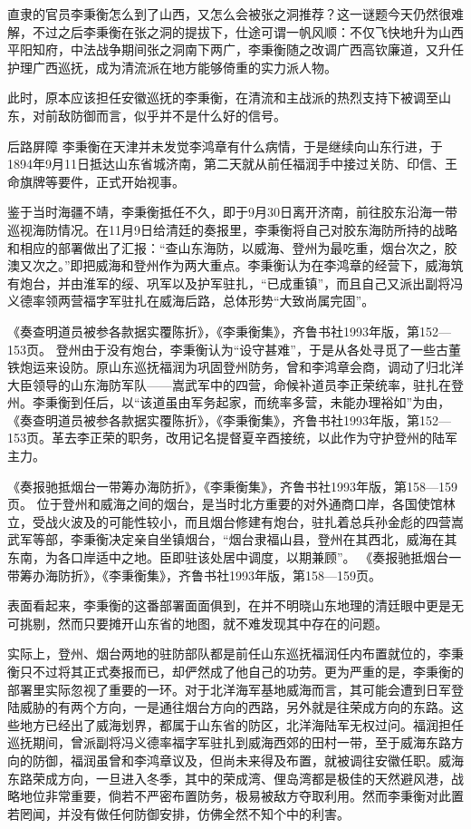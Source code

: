 \documentclass[12pt,UTF8]{ctexbook}
\begin{document}
直隶的官员李秉衡怎么到了山西，又怎么会被张之洞推荐？这一谜题今天仍然很难解，不过之后李秉衡在张之洞的提拔下，仕途可谓一帆风顺：不仅飞快地升为山西平阳知府，中法战争期间张之洞南下两广，李秉衡随之改调广西高钦廉道，又升任护理广西巡抚，成为清流派在地方能够倚重的实力派人物。

此时，原本应该担任安徽巡抚的李秉衡，在清流和主战派的热烈支持下被调至山东，对前敌防御而言，似乎并不是什么好的信号。

后路屏障
李秉衡在天津并未发觉李鸿章有什么病情，于是继续向山东行进，于1894年9月11日抵达山东省城济南，第二天就从前任福润手中接过关防、印信、王命旗牌等要件，正式开始视事。

鉴于当时海疆不靖，李秉衡抵任不久，即于9月30日离开济南，前往胶东沿海一带巡视海防情况。在11月9日给清廷的奏报里，李秉衡将自己对胶东海防所持的战略和相应的部署做出了汇报：“查山东海防，以威海、登州为最吃重，烟台次之，胶澳又次之。”即把威海和登州作为两大重点。李秉衡认为在李鸿章的经营下，威海筑有炮台，并由淮军的绥、巩军以及护军驻扎，“已成重镇”，而且自己又派出副将冯义德率领两营福字军驻扎在威海后路，总体形势“大致尚属完固”。

《奏查明道员被参各款据实覆陈折》，《李秉衡集》，齐鲁书社1993年版，第152—153页。
登州由于没有炮台，李秉衡认为“设守甚难”，于是从各处寻觅了一些古董铁炮运来设防。原山东巡抚福润为巩固登州防务，曾和李鸿章会商，调动了归北洋大臣领导的山东海防军队——嵩武军中的四营，命候补道员李正荣统率，驻扎在登州。李秉衡到任后，以“该道虽由军务起家，而统率多营，未能办理裕如”为由， 《奏查明道员被参各款据实覆陈折》，《李秉衡集》，齐鲁书社1993年版，第152—153页。革去李正荣的职务，改用记名提督夏辛酉接统，以此作为守护登州的陆军主力。

《奏报驰抵烟台一带筹办海防折》，《李秉衡集》，齐鲁书社1993年版，第158—159页。
位于登州和威海之间的烟台，是当时北方重要的对外通商口岸，各国使馆林立，受战火波及的可能性较小，而且烟台修建有炮台，驻扎着总兵孙金彪的四营嵩武军等部，李秉衡决定亲自坐镇烟台，“烟台隶福山县，登州在其西北，威海在其东南，为各口岸适中之地。臣即驻该处居中调度，以期兼顾”。 《奏报驰抵烟台一带筹办海防折》，《李秉衡集》，齐鲁书社1993年版，第158—159页。

表面看起来，李秉衡的这番部署面面俱到，在并不明晓山东地理的清廷眼中更是无可挑剔，然而只要摊开山东省的地图，就不难发现其中存在的问题。

实际上，登州、烟台两地的驻防部队都是前任山东巡抚福润任内布置就位的，李秉衡只不过将其正式奏报而已，却俨然成了他自己的功劳。更为严重的是，李秉衡的部署里实际忽视了重要的一环。对于北洋海军基地威海而言，其可能会遭到日军登陆威胁的有两个方向，一是通往烟台方向的西路，另外就是往荣成方向的东路。这些地方已经出了威海划界，都属于山东省的防区，北洋海陆军无权过问。福润担任巡抚期间，曾派副将冯义德率福字军驻扎到威海西郊的田村一带，至于威海东路方向的防御，福润虽曾和李鸿章议及，但尚未来得及布置，就被调往安徽任职。威海东路荣成方向，一旦进入冬季，其中的荣成湾、俚岛湾都是极佳的天然避风港，战略地位非常重要，倘若不严密布置防务，极易被敌方夺取利用。然而李秉衡对此置若罔闻，并没有做任何防御安排，仿佛全然不知个中的利害。
\end{document}

